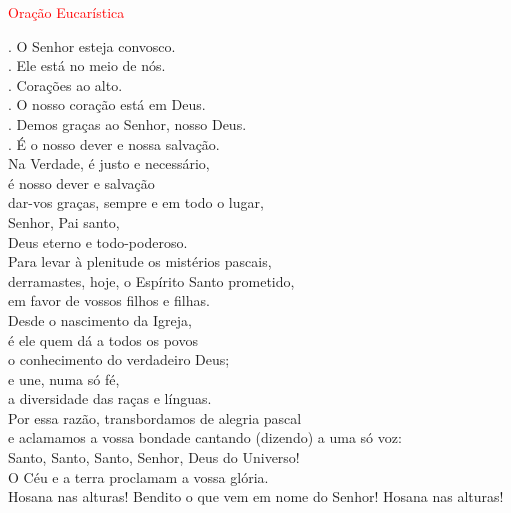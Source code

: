 \documentclass{book}
\begin{document}
\newpage

\begin{center}

    \textcolor{red}{Oração Eucarística}

\end{center}

\begin{flushleft}
    {\color{red} \Vbar.} O Senhor esteja convosco. \\
    {\color{red} \Rbar.} Ele está no meio de nós. \\
    {\color{red} \Vbar.} Corações ao alto. \\
    {\color{red} \Rbar.} O nosso coração está em Deus. \\
    {\color{red} \Vbar.} Demos graças ao Senhor, nosso Deus. \\
    {\color{red} \Rbar.} É o nosso dever e nossa salvação.
    \vspace{.1cm} \\
    Na Verdade, é justo e necessário, \\
    é nosso dever e salvação \\
    dar-vos graças, sempre e em todo o lugar, \\
    Senhor, Pai santo, \\
    Deus eterno e todo-poderoso.
    \vspace{.1cm} \\
    Para levar à plenitude os mistérios pascais, \\
    derramastes, hoje, o Espírito Santo prometido, \\
    em favor de vossos filhos e filhas.
    \vspace{.1cm} \\
    Desde o nascimento da Igreja, \\
    é ele quem dá a todos os povos \\
    o conhecimento do verdadeiro Deus; \\
    e une, numa só fé, \\
    a diversidade das raças e línguas.
    \vspace{.1cm} \\
    Por essa razão, transbordamos de alegria pascal \\
    e aclamamos a vossa bondade cantando {\color{red}(}dizendo{\color{red})} a uma só voz:
    \vspace{.1cm} \\
    Santo, Santo, Santo, Senhor, Deus do Universo! \\
    O Céu e a terra proclamam a vossa glória. \\
    Hosana nas alturas! Bendito o que vem em nome do Senhor! Hosana nas alturas!


\end{flushleft}
\end{document}
